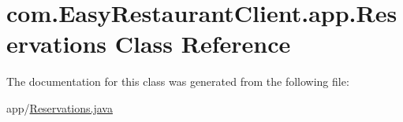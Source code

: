 \hypertarget{classcom_1_1_easy_restaurant_client_1_1app_1_1_reservations}{}\section{com.\+Easy\+Restaurant\+Client.\+app.\+Reservations Class Reference}
\label{classcom_1_1_easy_restaurant_client_1_1app_1_1_reservations}


The documentation for this class was generated from the following file\+:\begin{DoxyCompactItemize}
\item 
app/\mbox{\hyperlink{_reservations_8java}{Reservations.\+java}}\end{DoxyCompactItemize}
